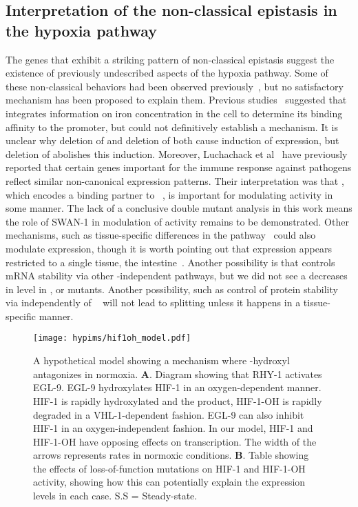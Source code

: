 \subsection*{Interpretation of the non-classical epistasis in the hypoxia pathway}
The \hifohtargets{} genes that exhibit a striking pattern of
non-classical epistasis suggest the existence of previously undescribed aspects
of the hypoxia pathway. Some of these non-classical behaviors had been observed
previously~\citep{Ackerman2012,Romney2011,Luhachack2012}, but no satisfactory
mechanism has been proposed to explain them. Previous
studies~\citep{Romney2011,Ackerman2012} suggested that \hifp{} integrates
information on iron concentration in the cell to determine its binding affinity
to the \ftna{} promoter, but could not definitively establish a mechanism. It is
unclear why deletion of  and deletion of  both cause
induction of \ftna{} expression, but deletion of  abolishes this
induction. Moreover, Luchachack et al~\citep{Luhachack2012} have previously
reported that certain genes important for the \cel{} immune response against
pathogens reflect similar non-canonical expression patterns. Their
interpretation was that , which encodes a binding partner to
\eglp{}~\citep{Shao2010}, is important for modulating \hifp{} activity in some
manner. The lack of a conclusive double mutant analysis in this work means the
role of SWAN-1 in modulation of \hifp{} activity remains to be demonstrated.
Other mechanisms, such as tissue-specific differences in the
pathway~\citep{Budde2010} could also modulate expression, though it is worth
pointing out that \ftna{} expression appears restricted to a single tissue, the
intestine~\citep{Kim2004}. Another possibility is that  controls
 mRNA stability via other -independent pathways, but we
did not see a decreases in  level in \egl{}, \rhy{} or \vhl{} mutants.
Another possibility, such as control of protein stability via 
independently of ~\citep{Chintala2012} will not lead to splitting
unless it happens in a tissue-specific manner.

\begin{figure}[tbhp]
  \centering
  \texttt{[image: hypims/hif1oh\_model.pdf]}
  \caption{
    A hypothetical model showing a mechanism where \hifp{}-hydroxyl antagonizes
    \hifp{} in normoxia. \textbf{A}. Diagram showing that RHY-1 activates EGL-9.
    EGL-9 hydroxylates HIF-1 in an oxygen-dependent manner. HIF-1 is
    rapidly hydroxylated and the product, HIF-1-OH is rapidly degraded in a
    VHL-1-dependent fashion. EGL-9 can also inhibit
    HIF-1 in an oxygen-independent fashion. In our model, HIF-1 and HIF-1-OH
    have opposing effects on transcription. The width of the arrows represents
    rates in normoxic conditions.
    \textbf{B}. Table showing the effects of loss-of-function mutations on HIF-1
    and HIF-1-OH activity, showing how this can potentially explain the
     expression levels in each case. S.S = Steady-state.
  }
\label{fig:hif1oh_table}
\end{figure}

